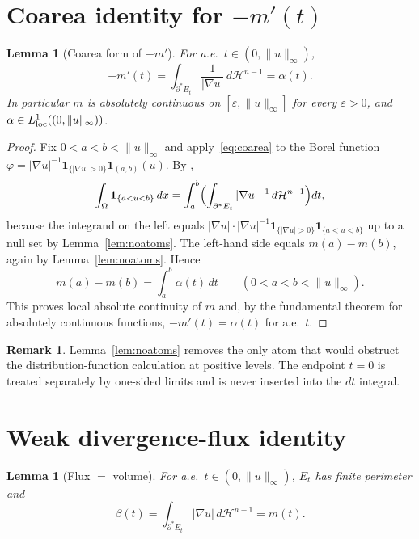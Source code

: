 \documentclass[11pt]{article}
\newtheorem{lemma}[theorem]{Lemma}
\theoremstyle{definition}
\newtheorem{remark}[theorem]{Remark}
\newcommand{\Om}{\Omega}
\newcommand{\eps}{\varepsilon}
\begin{document}
\section{Coarea identity for $-m'(t)$}\label{sec:coarea}

\begin{lemma}[Coarea form of $-m'$]\label{lem:coarea}
For a.e.\ $t\in(0,\|u\|_{\infty})$,
\begin{equation}\label{eq:L1}
   -m'(t)
   =\int_{\partial^{*}E_{t}}\frac{1}{|\nabla u|}\,d\mathcal H^{n-1}
   =\alpha(t).
\end{equation}
In particular $m$ is absolutely continuous on $[\eps,\|u\|_{\infty}]$ for
every $\eps>0$, and $\alpha\in L^{1}_{\rm loc}((0,\|u\|_{\infty}))$.
\end{lemma}

\begin{proof}
Fix $0<a<b<\|u\|_{\infty}$ and apply~\eqref{eq:coarea}
to the Borel function $\varphi=|\nabla u|^{-1}
\mathbf 1_{\{|\nabla u|>0\}}\mathbf 1_{(a,b)}(u)$. By
\cite[Thm.~13.1]{Maggi2012},
\[
   \int_{\Om}\mathbf 1_{\{a<u<b\}}\,dx
   =\int_{a}^{b}
     \Bigl(\int_{\partial^{*}E_{t}}|\nabla u|^{-1}\,d\mathcal H^{n-1}
     \Bigr)dt,
\]
because the integrand on the left equals
$|\nabla u|\cdot|\nabla u|^{-1}\mathbf 1_{\{|\nabla u|>0\}}
\mathbf 1_{\{a<u<b\}}$ up to a null set by Lemma~\ref{lem:noatoms}.  The
left-hand side equals $m(a)-m(b)$, again by Lemma~\ref{lem:noatoms}.  Hence
\[
   m(a)-m(b)=\int_a^b\alpha(t)\,dt
   \qquad(0<a<b<\|u\|_{\infty}).
\]
This proves local absolute continuity of $m$ and, by the fundamental
theorem for absolutely continuous functions, $-m'(t)=\alpha(t)$ for a.e.\
$t$.
\end{proof}

\begin{remark}\label{rem:plateaus}
Lemma~\ref{lem:noatoms} removes the only atom that would obstruct the
distribution-function calculation at positive levels.  The endpoint
$t=0$ is treated separately by one-sided limits and is never inserted
into the $dt$ integral.
\end{remark}

\section{Weak divergence-flux identity}\label{sec:flux}

\begin{lemma}[Flux $=$ volume]\label{lem:flux}
For a.e.\ $t\in(0,\|u\|_{\infty})$, $E_{t}$ has finite perimeter and
\begin{equation}\label{eq:L2}
   \beta(t)=
   \int_{\partial^{*}E_{t}}|\nabla u|\,d\mathcal H^{n-1}
   =m(t).
\end{equation}
\end{lemma}
\end{document}
